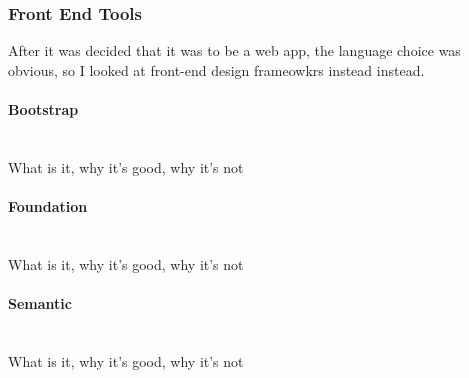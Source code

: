 \subsubsection{Front End Tools}
{\color{purple}
After it was decided that it was to be a web app, the language choice was obvious, so I looked at front-end design frameowkrs instead instead.
}
\paragraph{Bootstrap}\ \\
{\color{red} What is it, why it's good, why it's not}

\paragraph{Foundation}\ \\
{\color{red} What is it, why it's good, why it's not}

\paragraph{Semantic}\ \\
{\color{red} What is it, why it's good, why it's not}